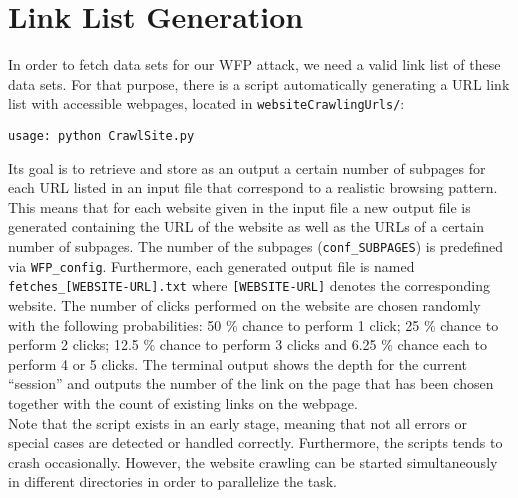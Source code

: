 \chapter{Link List Generation}
\label{chap:list_generation}

In order to fetch data sets for our \ac{WFP} attack, we need a valid link list of these data sets. For that purpose, there is a script automatically generating a \ac{URL} link list with accessible webpages, located in \texttt{websiteCrawlingUrls/}:
\begin{verbatim}
usage: python CrawlSite.py
\end{verbatim} 
Its goal is to retrieve and store as an output a certain number of subpages for each \ac{URL} listed in an input file that correspond to a realistic browsing pattern. This means that for each website given in the input file a new output file is generated containing the \ac{URL} of the website as well as the \ac{URL}s of a certain number of subpages. The number of the subpages (\texttt{conf\_SUBPAGES}) is predefined via \texttt{WFP\_config}. Furthermore, each generated output file is named \texttt{fetches\_[WEBSITE-URL].txt} where \texttt{[WEBSITE-URL]} denotes the corresponding website. The number of clicks performed on the website are chosen randomly with the following probabilities: 50 \% chance to perform 1 click; 25 \% chance to perform 2 clicks; 12.5 \% chance to perform 3 clicks and 6.25 \% chance each to perform 4 or 5 clicks. The terminal output shows the depth for the current ``session'' and outputs the number of the link on the page that has been chosen together with the count of existing links on the webpage.\\
Note that the script exists in an early stage, meaning that not all errors or special cases are detected or handled correctly. Furthermore, the scripts tends to crash occasionally. However, the website crawling can be started simultaneously in different directories in order to parallelize the task.

